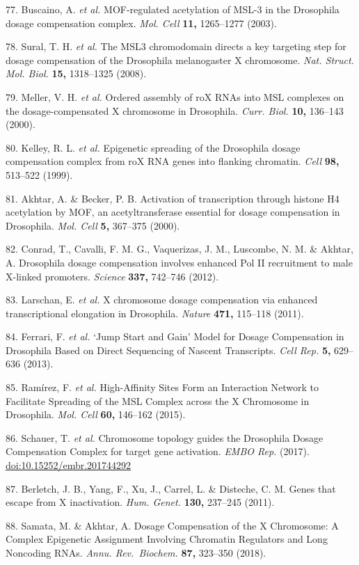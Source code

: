 \documentclass[11pt,twoside]{MPIthesis}
\theoremstyle{definition}
\theoremstyle{definition}
\theoremstyle{definition}
\theoremstyle{remark}
\begin{document}
77. Buscaino, A. \emph{et al.} MOF-regulated acetylation of MSL-3 in the
Drosophila dosage compensation complex. \emph{Mol. Cell} \textbf{11,}
1265--1277 (2003).

78. Sural, T. H. \emph{et al.} The MSL3 chromodomain directs a key
targeting step for dosage compensation of the Drosophila melanogaster X
chromosome. \emph{Nat. Struct. Mol. Biol.} \textbf{15,} 1318--1325
(2008).

79. Meller, V. H. \emph{et al.} Ordered assembly of roX RNAs into MSL
complexes on the dosage-compensated X chromosome in Drosophila.
\emph{Curr. Biol.} \textbf{10,} 136--143 (2000).

80. Kelley, R. L. \emph{et al.} Epigenetic spreading of the Drosophila
dosage compensation complex from roX RNA genes into flanking chromatin.
\emph{Cell} \textbf{98,} 513--522 (1999).

81. Akhtar, A. \& Becker, P. B. Activation of transcription through
histone H4 acetylation by MOF, an acetyltransferase essential for dosage
compensation in Drosophila. \emph{Mol. Cell} \textbf{5,} 367--375
(2000).

82. Conrad, T., Cavalli, F. M. G., Vaquerizas, J. M., Luscombe, N. M. \&
Akhtar, A. Drosophila dosage compensation involves enhanced Pol II
recruitment to male X-linked promoters. \emph{Science} \textbf{337,}
742--746 (2012).

83. Larschan, E. \emph{et al.} X chromosome dosage compensation via
enhanced transcriptional elongation in Drosophila. \emph{Nature}
\textbf{471,} 115--118 (2011).

84. Ferrari, F. \emph{et al.} `Jump Start and Gain' Model for Dosage
Compensation in Drosophila Based on Direct Sequencing of Nascent
Transcripts. \emph{Cell Rep.} \textbf{5,} 629--636 (2013).

85. Ramírez, F. \emph{et al.} High-Affinity Sites Form an Interaction
Network to Facilitate Spreading of the MSL Complex across the X
Chromosome in Drosophila. \emph{Mol. Cell} \textbf{60,} 146--162 (2015).

86. Schauer, T. \emph{et al.} Chromosome topology guides the Drosophila
Dosage Compensation Complex for target gene activation. \emph{EMBO Rep.}
(2017). \url{doi:10.15252/embr.201744292}

87. Berletch, J. B., Yang, F., Xu, J., Carrel, L. \& Disteche, C. M.
Genes that escape from X inactivation. \emph{Hum. Genet.} \textbf{130,}
237--245 (2011).

88. Samata, M. \& Akhtar, A. Dosage Compensation of the X Chromosome: A
Complex Epigenetic Assignment Involving Chromatin Regulators and Long
Noncoding RNAs. \emph{Annu. Rev.~Biochem.} \textbf{87,} 323--350 (2018).
\end{document}
